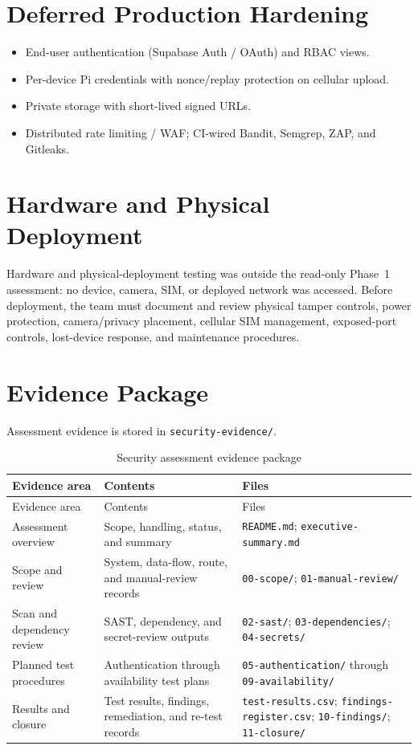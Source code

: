 \documentclass[12pt]{article}
\newcommand{\toprule}{\hline}
\newcommand{\midrule}{\hline}
\newcommand{\bottomrule}{\hline}
\begin{document}
\section{Deferred Production Hardening}

\begin{itemize}
    \item End-user authentication (Supabase Auth / OAuth) and RBAC views.
    \item Per-device Pi credentials with nonce/replay protection on cellular
          upload.
    \item Private storage with short-lived signed URLs.
    \item Distributed rate limiting / WAF; CI-wired Bandit, Semgrep, ZAP, and
          Gitleaks.
\end{itemize}

\section{Hardware and Physical Deployment}
\label{sec:hardware}

Hardware and physical-deployment testing was outside the read-only Phase~1
assessment: no device, camera, SIM, or deployed network was accessed. Before
deployment, the team must document and review physical tamper controls, power
protection, camera/privacy placement, cellular SIM management, exposed-port
controls, lost-device response, and maintenance procedures.

\appendix
\section{Evidence Package}
\label{sec:evidence-package}

Assessment evidence is stored in \texttt{security-evidence/}.

\begin{longtable}{p{}p{}p{}}
\caption{Security assessment evidence package}\label{tab:evidence-package}\\
\toprule
Evidence area & Contents & Files \\
\midrule
\endfirsthead
\toprule
Evidence area & Contents & Files \\
\midrule
\endhead
Assessment overview & Scope, handling, status, and summary & \texttt{README.md}; \texttt{executive-summary.md} \\
Scope and review & System, data-flow, route, and manual-review records & \texttt{00-scope/}; \texttt{01-manual-review/} \\
Scan and dependency review & SAST, dependency, and secret-review outputs & \texttt{02-sast/}; \texttt{03-dependencies/}; \texttt{04-secrets/} \\
Planned test procedures & Authentication through availability test plans & \texttt{05-authentication/} through \texttt{09-availability/} \\
Results and closure & Test results, findings, remediation, and re-test records & \texttt{test-results.csv}; \texttt{findings-register.csv}; \texttt{10-findings/}; \texttt{11-closure/} \\
\bottomrule
\end{longtable}
\end{document}

